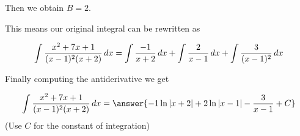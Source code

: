 \documentclass{ximera}
\begin{document}
\begin{exercise}
\begin{exercise}
Then we obtain $B=2$. 

\begin{exercise}
This means our original integral can be rewritten as 

\[
\int \frac{x^{2}+7x+1}{(x-1)^{2}(x+2)} \mathop{}\!d x= \int \frac{-1}{x+2} \mathop{}\!d x + \int \frac{2}{x-1} \mathop{}\!d x + \int \frac{ 3  }{(x-1)^{2}}   \mathop{}\!d x
\]

 Finally computing the antiderivative we get 

\[
\int \frac{x^{2}+7x+1}{(x-1)^{2}(x+2)} \d x= \answer{ -1\ln|x+2|+2\ln|x-1| -\frac{3}{x-1}+ C }
\]
(Use $C$ for the constant of integration)




\end{exercise}
\end{exercise}
\end{exercise}
\end{document}
